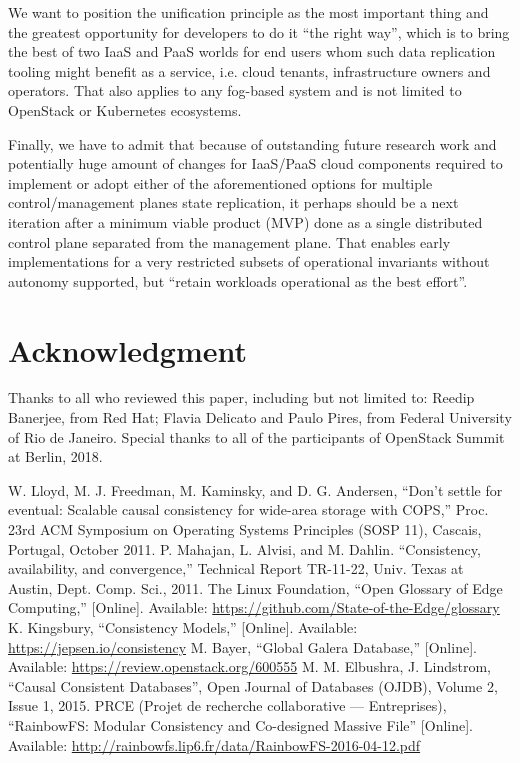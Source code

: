\documentclass[conference]{IEEEtran}
\begin{document}
We want to position the unification principle as the most important thing and
the greatest opportunity for developers to do it ``the right way'', which is to
bring the best of two IaaS and PaaS worlds for end users whom such data
replication tooling might benefit as a service, i.e. cloud tenants,
infrastructure owners and operators. That also applies to any fog-based system
and is not limited to OpenStack or Kubernetes ecosystems.

Finally, we have to admit that because of outstanding future research work and
potentially huge amount of changes for IaaS/PaaS cloud components required to
implement or adopt either of the aforementioned options for multiple
control/management planes state replication, it perhaps should be a next
iteration after a minimum viable product (MVP) done as a single distributed
control plane separated from the management plane. That enables early
implementations for a very restricted subsets of operational invariants without
autonomy supported, but ``retain workloads operational as the best
effort''.

\section*{Acknowledgment}
Thanks to all who reviewed this paper, including but not limited to:
Reedip Banerjee, from Red Hat; Flavia Delicato and Paulo Pires, from Federal
University of Rio de Janeiro. Special thanks to all of the participants of
OpenStack Summit at Berlin, 2018.

\begin{thebibliography}{00}
 W. Lloyd, M. J. Freedman, M. Kaminsky, and D. G. Andersen, ``Don’t settle for eventual: Scalable causal consistency for wide-area storage with COPS,'' Proc. 23rd ACM Symposium on Operating Systems Principles (SOSP 11), Cascais, Portugal, October 2011.
 P. Mahajan, L. Alvisi, and M. Dahlin. ``Consistency, availability, and convergence,'' Technical Report TR-11-22, Univ. Texas at Austin, Dept. Comp. Sci., 2011.
 The Linux Foundation, ``Open Glossary of Edge Computing,'' [Online]. Available: \url{https://github.com/State-of-the-Edge/glossary}
 K. Kingsbury, ``Consistency Models,'' [Online]. Available: \url{https://jepsen.io/consistency}
 M. Bayer, ``Global Galera Database,'' [Online]. Available: \url{https://review.openstack.org/600555}
 M. M. Elbushra, J. Lindstrom, ``Causal Consistent Databases'', Open Journal of Databases (OJDB), Volume 2, Issue 1, 2015.
 PRCE (Projet de recherche collaborative — Entreprises), ``RainbowFS: Modular Consistency and Co-designed Massive File'' [Online]. Available: \url{http://rainbowfs.lip6.fr/data/RainbowFS-2016-04-12.pdf}
\end{thebibliography}
\end{document}
